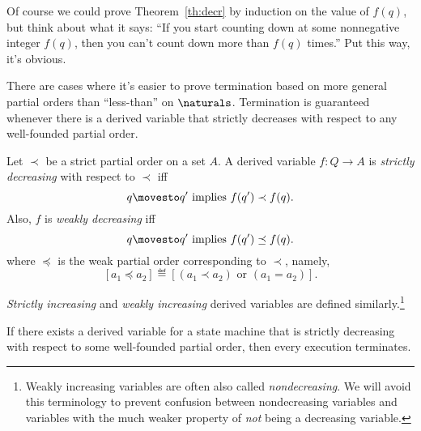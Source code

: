 Of course we could prove Theorem~\ref{th:decr} by induction on the value
of $f(q)$, but think about what it says: ``If you start counting down at
some nonnegative integer $f(q)$, then you can't count down more than
$f(q)$ times.''  Put this way, it's obvious.

There are cases where it's easier to prove termination based on more
general partial orders than ``less-than'' on $\naturals$.  Termination is
guaranteed whenever there is a derived variable that strictly decreases with
respect to any well-founded partial order.

\iffalse
We now define some other useful flavors of derived variables taking values
over partial ordered sets.  We'll use the notational convention that when
$\prec$ denotes a strict partial order on some set, then $\preceq$ is the
corresponding \emph{weak} partial order
\[
a\preceq a' \ \eqdef\quad a \prec a' \lor a = a'.
\]

A relation like $\prec$ is called a \emph{strict} partial order.  It is
transitive, antisymmetric, and but \emph{non}reflexive in the strongest
sense: $a \not\prec a$ for every $a \in A$.\footnote{In other words, if $a
\prec b$, then it is not the case that $b \prec a$.  This property is also
called \emph{a}symmetry.}\fi

\begin{definition}
Let $\prec$ be a strict partial order on a set $A$.  A derived variable
$f : Q \to A$ is \emph{strictly decreasing} with respect to $\prec$ iff
\[
q \movesto q' \text{ implies } f(q') \prec f(q).
\]
Also, $f$ is \emph{weakly decreasing} iff
\[
q \movesto q' \text{  implies  } f(q') \preceq f(q).
\]
where $\preceq$ is the weak partial order corresponding to $\prec$,
namely,
\[
[a_1 \preceq a_2] \eqdef [(a_1 \prec a_2) \text{ or } (a_1=a_2)].
\]

\emph{Strictly increasing} and \emph{weakly increasing} derived variables
are defined similarly.\footnote{Weakly increasing variables are often also
called \emph{nondecreasing}.  We will avoid this terminology to prevent
confusion between nondecreasing variables and variables with the much
weaker property of \emph{not} being a decreasing variable.}
\end{definition}

\begin{theorem}\label{well-founded-decreasing}
  If there exists a derived variable for a state machine that is strictly
  decreasing with respect to some well-founded partial order, then every
  execution terminates.
\end{theorem}

